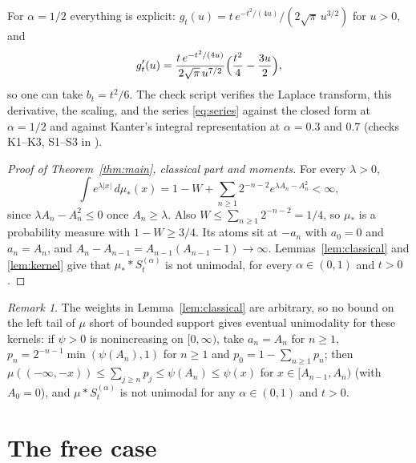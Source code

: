 \documentclass[11pt]{amsart}
\theoremstyle{definition}
\theoremstyle{remark}
\newtheorem{remark}[theorem]{Remark}
\numberwithin{equation}{section}
\begin{document}
For $\alpha=1/2$ everything is explicit: $g_t(u)=t\,e^{-t^2/(4u)}/(2\sqrt\pi\,u^{3/2})$ for $u>0$, and
\[
g_t'(u)=\frac{t\,e^{-t^2/(4u)}}{2\sqrt\pi\,u^{7/2}}\Bigl(\frac{t^2}{4}-\frac{3u}{2}\Bigr),
\]
so one can take $b_t=t^2/6$. The check script verifies the Laplace transform, this derivative, the scaling, and the series \eqref{eq:series} against the closed form at $\alpha=1/2$ and against Kanter's integral representation \cite{Kanter} at $\alpha=0.3$ and $0.7$ (checks K1--K3, S1--S3 in \cite{code}).

\begin{proof}[Proof of Theorem~\ref{thm:main}, classical part and moments]
For every $\lambda>0$,
\[
\int e^{\lambda|x|}\,d\mu_\ast(x)=1-W+\sum_{n\ge1}2^{-n-2}e^{\lambda A_n-A_n^2}<\infty,
\]
since $\lambda A_n-A_n^2\le0$ once $A_n\ge\lambda$. Also $W\le\sum_{n\ge1}2^{-n-2}=1/4$, so $\mu_\ast$ is a probability measure with $1-W\ge3/4$. Its atoms sit at $-a_n$ with $a_0=0$ and $a_n=A_n$, and $A_n-A_{n-1}=A_{n-1}(A_{n-1}-1)\to\infty$. Lemmas~\ref{lem:classical} and \ref{lem:kernel} give that $\mu_\ast*S^{(\alpha)}_t$ is not unimodal, for every $\alpha\in(0,1)$ and $t>0$.
\end{proof}

\begin{remark}
The weights in Lemma~\ref{lem:classical} are arbitrary, so no bound on the left tail of $\mu$ short of bounded support gives eventual unimodality for these kernels: if $\psi>0$ is nonincreasing on $[0,\infty)$, take $a_n=A_n$ for $n\ge1$, $p_n=2^{-n-1}\min(\psi(A_n),1)$ for $n\ge1$ and $p_0=1-\sum_{n\ge1}p_n$; then $\mu((-\infty,-x))\le\sum_{j\ge n}p_j\le\psi(A_n)\le\psi(x)$ for $x\in[A_{n-1},A_n)$ (with $A_0=0$), and $\mu*S^{(\alpha)}_t$ is not unimodal for any $\alpha\in(0,1)$ and $t>0$.
\end{remark}

\section{The free case}\label{sec:free}
\end{document}
